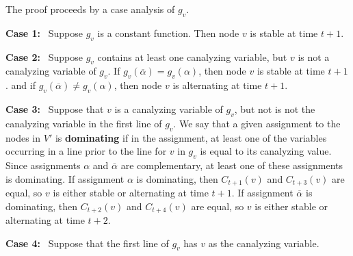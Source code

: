 The proof proceeds by a case analysis of $g_v$.

\medskip

\noindent
\textbf{Case 1:}~ Suppose $g_v$ is a constant function.
Then node $v$ is stable at time $t+1$.

\medskip

\noindent
\textbf{Case 2:}~ Suppose $g_v$ contains at least one canalyzing variable, 
but $v$ is not a canalyzing variable of $g_v$.
If $g_v(\overline{\alpha}) = g_v(\alpha)$, then node $v$ is stable at time $t+1$.
and if $g_v(\overline{\alpha}) \neq g_v(\alpha)$, 
then node $v$ is alternating at time $t+1$.

\medskip

\noindent
\textbf{Case 3:}~ Suppose that $v$ is a canalyzing variable of
$g_v$, but not is not the canalyzing variable in the first line of
$g_v$.  We say that a given assignment to the nodes in $V'$ is {\bf
dominating} if in the assignment, at least one of the variables
occurring in a line prior to the line for $v$ in $g_v$ is equal to
its canalyzing value.  Since assignments $\alpha$  and $\overline{\alpha}$
are complementary, at least one of these assignments is dominating.
If assignment $\alpha$  is dominating, then $C_{t+1}(v)$ and
$C_{t+3}(v)$ are equal, so $v$ is either stable or alternating at
time $t+1$.  If assignment $\overline{\alpha}$  is dominating, then
$C_{t+2}(v)$ and $C_{t+4}(v)$ are equal, so $v$ is either stable
or alternating at time $t+2$.

\noindent \textbf{Case 4:}~ Suppose that the first line of $g_v$
has $v$ as the canalyzing variable.

